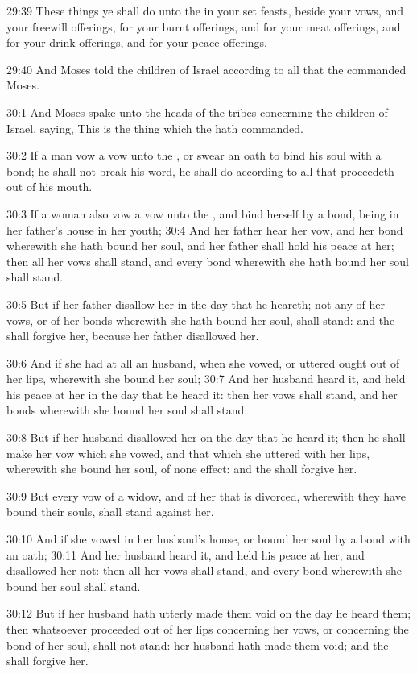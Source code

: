 29:39 These things ye shall do unto the \LORD in your set feasts, beside your vows, and your freewill offerings, for your burnt offerings, and for your meat offerings, and for your drink offerings, and for your peace offerings.

29:40 And Moses told the children of Israel according to all that the \LORD commanded Moses.

30:1 And Moses spake unto the heads of the tribes concerning the children of Israel, saying, This is the thing which the \LORD hath commanded.

30:2 If a man vow a vow unto the \LORD, or swear an oath to bind his soul with a bond; he shall not break his word, he shall do according to all that proceedeth out of his mouth.

30:3 If a woman also vow a vow unto the \LORD, and bind herself by a bond, being in her father's house in her youth; 30:4 And her father hear her vow, and her bond wherewith she hath bound her soul, and her father shall hold his peace at her; then all her vows shall stand, and every bond wherewith she hath bound her soul shall stand.

30:5 But if her father disallow her in the day that he heareth; not any of her vows, or of her bonds wherewith she hath bound her soul, shall stand: and the \LORD shall forgive her, because her father disallowed her.

30:6 And if she had at all an husband, when she vowed, or uttered ought out of her lips, wherewith she bound her soul; 30:7 And her husband heard it, and held his peace at her in the day that he heard it: then her vows shall stand, and her bonds wherewith she bound her soul shall stand.

30:8 But if her husband disallowed her on the day that he heard it; then he shall make her vow which she vowed, and that which she uttered with her lips, wherewith she bound her soul, of none effect: and the \LORD shall forgive her.

30:9 But every vow of a widow, and of her that is divorced, wherewith they have bound their souls, shall stand against her.

30:10 And if she vowed in her husband's house, or bound her soul by a bond with an oath; 30:11 And her husband heard it, and held his peace at her, and disallowed her not: then all her vows shall stand, and every bond wherewith she bound her soul shall stand.

30:12 But if her husband hath utterly made them void on the day he heard them; then whatsoever proceeded out of her lips concerning her vows, or concerning the bond of her soul, shall not stand: her husband hath made them void; and the \LORD shall forgive her.


